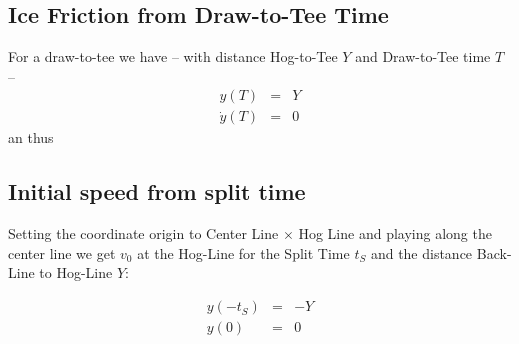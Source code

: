\subsection{Ice Friction from Draw-to-Tee Time}
For a draw-to-tee we have -- with distance Hog-to-Tee $Y$ and Draw-to-Tee time 
$T$ --
\begin{eqnarray}
y(T) &=& Y \\
\dot y(T) &=& 0
\end{eqnarray}
an thus

\subsection{Initial speed from split time}
Setting the coordinate origin to Center Line $\times$ Hog Line and playing 
along the center line we get $v_0$ at the Hog-Line for the Split Time $t_S$ and 
the distance Back-Line to Hog-Line $Y$:

\begin{eqnarray}
y(-t_S) &=& -Y \\
y(0) &=& 0
\end{eqnarray}


